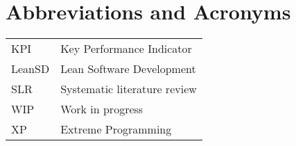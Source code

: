 \chapter*{Abbreviations and Acronyms}


\noindent
\begin{longtable}{@{}p{}p{}@{}}
KPI & Key Performance Indicator\\
LeanSD & Lean Software Development\\
SLR & Systematic literature review\\
WIP & Work in progress\\
XP & Extreme Programming\\
\end{longtable}
